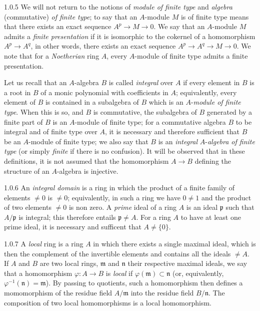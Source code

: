 \documentclass[../main.tex]{subfiles}
\begin{document}
\begin{env}{1.0.5}
We will not return to the notions of \emph{module of finite type} and
\emph{algebra} (commutative) \emph{of finite type}; to say that an $A$-module $M$
is of finite type means that there exists an exact sequence $A^p\to M\to 0$. We say that
an $A$-module $M$ admits a \emph{finite presentation} if it is isomorphic to the cokernel
of a homomorphism $A^p\to A^q$, in other words, there exists an exact sequence
$A^p\to A^q\to M\to 0$. We note that for a \emph{Noetherian} ring $A$, every $A$-module
of finite type admits a finite presentation.

Let us recall that an $A$-algebra $B$ is called \emph{integral} over $A$ if every element
in $B$ is a root in $B$ of a monic polynomial with coefficients in $A$; equivalently, every
element of $B$ is contained in a subalgebra of $B$ which is an $A$-\emph{module of finite type}.
When this is so, and $B$ is commutative, the subalgebra of $B$ generated by a finite part of
$B$ is an $A$-module of finite type; for a commutative algebra $B$ to be integral and of finite
type over $A$, it is necessary and therefore sufficient that $B$ be an $A$-module of finite
type; we also say that $B$ is an \emph{integral} $A$-\emph{algebra of finite type} (or
simply \emph{finite} if there is no confusion). It will be observed that in these definitions,
it is not assumed that the homomorphism $A\to B$ defining the structure of an $A$-algebra
is injective.
\end{env}

\begin{env}{1.0.6}
An \emph{integral domain} is a ring in which the product of a finite family of elements
$\neq 0$ is $\neq 0$; equivalently, in such a ring we have $0\neq 1$ and the product of
two elements $\neq 0$ is non zero. A \emph{prime} ideal of a ring $A$ is an ideal $\mathfrak{p}$
such that $A/\mathfrak{p}$ is integral; this therefore entails $\mathfrak{p}\neq A$. For a ring $A$ to
have at least one prime ideal, it is necessary and sufficent that $A\neq\{0\}$.
\end{env}

\begin{env}{1.0.7}
A \emph{local} ring is a ring $A$ in which there exists a single maximal ideal, which is then
the complement of the invertible elements and contains all the ideals $\neq A$. If $A$ and $B$
are two local rings, $\mathfrak{m}$ and $\mathfrak{n}$ their respective maximal ideals, we say that a
homomorphism $\varphi\colon A\to B$ is \emph{local} if $\varphi(\mathfrak{m})\subset\mathfrak{n}$ (or, equivalently,
$\varphi^{-1}(\mathfrak{n})=\mathfrak{m}$). By passing to quotients, such a homomorphism then defines
a momomorphism of the residue field $A/\mathfrak{m}$ into the residue field $B/\mathfrak{n}$. The
composition of two local homomorphisms is a local homomorphism.
\end{env}
\end{document}
